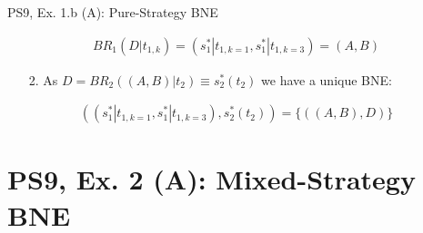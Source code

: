 \begin{frame}{PS9, Ex. 1.b (A): Pure-Strategy BNE}
\begin{multicols}{2}
      \begin{align*}
        BR_1\left(D|t_{1,k}\right)=(s_1^*|t_{1,k=1},s_1^*|t_{1,k=3})=(A,B)
      \end{align*}
      \vspace{-16pt}
      \begin{enumerate}
        \item[2.] As $D=BR_2\left((A,B)|t_2\right)\equiv s_2^*(t_2)$ we have a unique BNE:
      \end{enumerate}
      \vspace{-8pt}
      \begin{align*}
        \left((s_1^*|t_{1,k=1},s_1^*|t_{1,k=3}),s_2^*(t_2)\right)=\{((A,B),D)\}
      \end{align*}
      \vfill\null
    \end{multicols}
\end{frame}


\section{PS9, Ex. 2 (A): Mixed-Strategy BNE}

